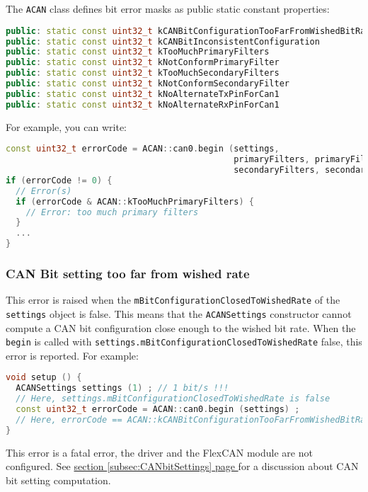 \documentclass[9pt, a4paper, obeyspaces, openany]{extarticle}
\newcommand\refSubsectionPage[1]{\hyperref[subsec:#1]{section \ref*{subsec:#1} page \pageref{subsec:#1}}}
\newcommand \subsubsectionLabel[2]{\subsubsection{#1}\label{subsubsec:#2}}
\begin{document}
The \texttt{ACAN} class defines bit error masks as public static constant properties: 
{ \small\begin{lstlisting}[language=c++]
public: static const uint32_t kCANBitConfigurationTooFarFromWishedBitRate = 1 << 0 ;
public: static const uint32_t kCANBitInconsistentConfiguration            = 1 << 1 ;
public: static const uint32_t kTooMuchPrimaryFilters                      = 1 << 2 ;
public: static const uint32_t kNotConformPrimaryFilter                    = 1 << 3 ;
public: static const uint32_t kTooMuchSecondaryFilters                    = 1 << 4 ;
public: static const uint32_t kNotConformSecondaryFilter                  = 1 << 5 ;
public: static const uint32_t kNoAlternateTxPinForCan1                    = 1 << 6 ;
public: static const uint32_t kNoAlternateRxPinForCan1                    = 1 << 7 ;
\end{lstlisting}}

For example, you can write:
{ \small\begin{lstlisting}[language=c++]
const uint32_t errorCode = ACAN::can0.begin (settings,
                                             primaryFilters, primaryFilterCount,
                                             secondaryFilters, secondaryFilterCount) ;
if (errorCode != 0) {
  // Error(s)
  if (errorCode & ACAN::kTooMuchPrimaryFilters) {
    // Error: too much primary filters
  }
  ...
}
\end{lstlisting}}

\subsubsectionLabel{CAN Bit setting too far from wished rate}{CANBitTooFarError}

This error is raised when the \texttt{mBitConfigurationClosedToWishedRate} of the \texttt{settings} object is false. This means that the \texttt{ACANSettings} constructor cannot compute a CAN bit configuration close enough to the wished bit rate. When the \texttt{begin} is called with \texttt{settings.mBitConfigurationClosedToWishedRate} false, this error is reported. For example:

{ \small\begin{lstlisting}[language=c++]
void setup () {
  ACANSettings settings (1) ; // 1 bit/s !!!
  // Here, settings.mBitConfigurationClosedToWishedRate is false
  const uint32_t errorCode = ACAN::can0.begin (settings) ;
  // Here, errorCode == ACAN::kCANBitConfigurationTooFarFromWishedBitRateErrorMask
}
\end{lstlisting}}

This error is a fatal error, the driver and the FlexCAN module are not configured. See \refSubsectionPage{CANbitSettings} for a discussion about CAN bit setting computation.
\end{document}
